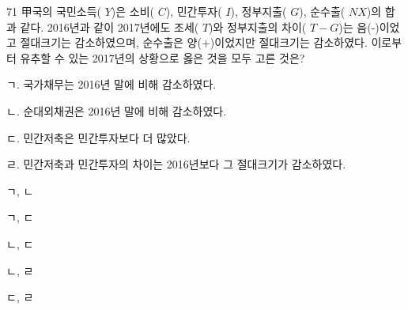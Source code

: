 \begin{question}{71}
甲국의 국민소득( $Y$)은 소비( $C$), 민간투자( $I$), 정부지출( $G$), 순수출( $NX$)의 합과 같다. 2016년과 같이 2017년에도 조세( $T$)와 정부지출의 차이( $T-G$)는 음(-)이었고 절대크기는 감소하였으며, 순수출은 양(+)이었지만 절대크기는 감소하였다. 이로부터 유추할 수 있는 2017년의 상황으로 옳은 것을 모두 고른 것은?
\begin{framedtext}
ㄱ. 국가채무는 2016년 말에 비해 감소하였다. \par
ㄴ. 순대외채권은 2016년 말에 비해 감소하였다. \par
ㄷ. 민간저축은 민간투자보다 더 많았다. \par
ㄹ. 민간저축과 민간투자의 차이는 2016년보다 그 절대크기가 감소하였다. \par
\end{framedtext}
\begin{choices}
  \item ㄱ, ㄴ
  \item ㄱ, ㄷ
  \item ㄴ, ㄷ
  \item ㄴ, ㄹ
  \item ㄷ, ㄹ
\end{choices}
\end{question}
